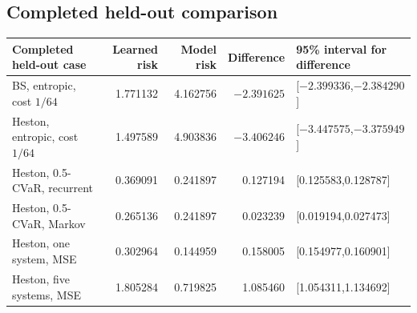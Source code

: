 \documentclass[8pt]{strategynet-journal}
\begin{document}
\subsection{Completed held-out comparison}
\begin{center}
\normalsize
\begin{tabular}{@{}lrrrl@{}}
\toprule
Completed held-out case & Learned risk & Model risk & Difference & 95\% interval for difference\\
\midrule
BS, entropic, cost $1/64$ &1.771132&4.162756&$-2.391625$&[$-2.399336$,$-2.384290$]\\
Heston, entropic, cost $1/64$ &1.497589&4.903836&$-3.406246$&[$-3.447575$,$-3.375949$]\\
Heston, 0.5-CVaR, recurrent &0.369091&0.241897&0.127194&[0.125583,0.128787]\\
Heston, 0.5-CVaR, Markov &0.265136&0.241897&0.023239&[0.019194,0.027473]\\
Heston, one system, MSE &0.302964&0.144959&0.158005&[0.154977,0.160901]\\
Heston, five systems, MSE &1.805284&0.719825&1.085460&[1.054311,1.134692]\\
\bottomrule
\end{tabular}
\end{center}
\end{document}
